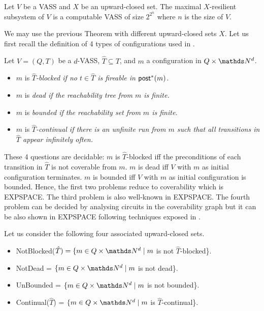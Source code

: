 \begin{theorem}{}
Let $V$ be a VASS and $X$ be an upward-closed set. The maximal $X$-resilient subsystem of $V$ is a computable VASS of size $2^{2^n}$ where $n$ is the size of $V$.
\end{theorem}

We may use the previous Theorem with different upward-closed sets $X$. Let us first recall the definition of 4 types of configurations used in \cite{DBLP:journals/acta/ValkJ85}.

\begin{definition}
Let $V = (Q,T)$ be a $d$-VASS, $\hat{T} \subseteq T$, and $m$ a configuration in $Q \times \N^d$.
\begin{itemize}
\item  $m$ is \em{$\hat{T}$-blocked} if no $t \in \hat{T}$ is fireable in $\textsf{post}^*(m)$.
\item $m$ is \em{dead} if the reachability tree from $m$ is finite.
\item $m$ is \em{bounded} if the reachability set from $m$ is finite.
\item $m$ is \em{$\hat{T}$-continual} if there is an unfinite run from $m$ such that all transitions in $\hat{T}$ appear infinitely often.
\end{itemize}
\end{definition}

These 4 questions are decidable: $m$ is $\hat{T}$-blocked iff the preconditions of each transition in $\hat{T}$ is not coverable from $m$.
$m$ is dead iff $V$ with $m$ as initial configuration terminates. $m$ is bounded iff $V$ with $m$ as initial configuration is bounded.
Hence, the first two problems reduce to coverability which is EXPSPACE. The third problem is also well-known in EXPSPACE. The fourth problem can be decided by analysing circuits in the coverability graph \cite{DBLP:journals/acta/ValkJ85} but it can be also shown in EXPSPACE following techniques exposed in \cite{DBLP:journals/jcss/Demri13}.

Let us consider the following four associated upward-closed sets.

\begin{itemize}
\item  NotBlocked($\hat{T})= \{ m \in Q \times \N^d \mid m$ is not $\hat{T}$-blocked\}.
\item NotDead = $\{ m \in Q \times \N^d \mid m$ is not dead\}.
\item UnBounded = $\{ m \in Q \times \N^d \mid m$ is not bounded\}.
\item Continual($\hat{T}$) = $\{ m \in Q \times \N^d \mid m$ is $\hat{T}$-continual\}.
\end{itemize}

